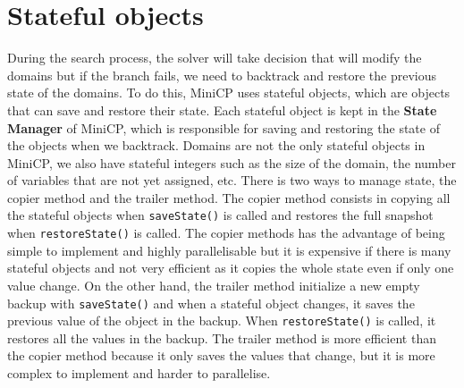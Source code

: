 \documentclass[12pt, openany]{report}
\theoremstyle{definition}
\begin{document}
\section{Stateful objects}
During the search process, the solver will take decision that will modify the domains but if the branch fails, we need to backtrack and restore the previous state of the domains. To do this, MiniCP uses stateful objects, which are objects that can save and restore their state. Each stateful object is kept in the \textbf{State Manager} of MiniCP, which is responsible for saving and restoring the state of the objects when we backtrack. Domains are not the only stateful objects in MiniCP, we also have stateful integers such as the size of the domain, the number of variables that are not yet assigned, etc. There is two ways to manage state, the copier method and the trailer method. The copier method consists in copying all the stateful objects when \texttt{saveState()} is called and restores the full snapshot when \texttt{restoreState()} is called. The copier methods has the advantage of being simple to implement and highly parallelisable but it is expensive if there is many stateful objects and not very efficient as it copies the whole state even if only one value change. On the other hand, the trailer method initialize a new empty backup with \texttt{saveState()} and when a stateful object changes, it saves the previous value of the object in the backup. When \texttt{restoreState()} is called, it restores all the values in the backup. The trailer method is more efficient than the copier method because it only saves the values that change, but it is more complex to implement and harder to parallelise. 
\end{document}
